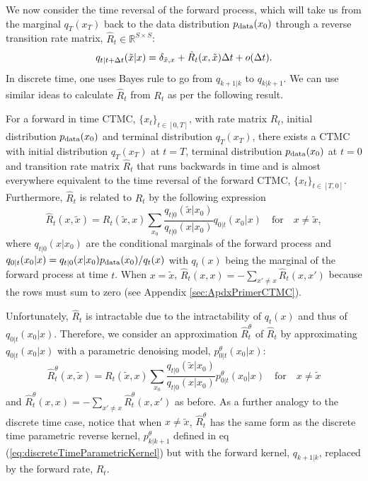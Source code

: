 \documentclass{article}
\begin{document}
We now consider the time reversal of the forward process, which will take us from the marginal $q_T(x_T)$ back to the data distribution $p_{\textup{data}}(x_0)$ through a reverse transition rate matrix, $\hat{R}_t \in \mathbb{R}^{S \times S}$:
\begin{equation}
    \textstyle q_{t | t+\Delta t}(\tilde{x} | x) = \delta_{\tilde{x}, x} + \hat{R}_t(x, \tilde{x}) \Delta t + o(\Delta t).
    \label{eq:reverseKernelDefn}
\end{equation}
In discrete time, one uses Bayes rule to go from $q_{k+1|k}$ to $q_{k|k+1}$. 
We can use similar ideas to calculate $\hat{R}_t$ from $R_t$ as per the following result.
\begin{proposition}
For a forward in time CTMC, $\{ x_t \}_{t \in [0, T]}$, with rate matrix $R_t$, initial distribution $p_{\textup{data}}(x_0)$ and terminal distribution $q_T(x_T)$, there exists a CTMC with initial distribution $q_T(x_T)$ at $t=T$, terminal distribution $p_{\textup{data}}(x_0)$ at $t=0$ and transition rate matrix $\hat{R}_t$ that runs backwards in time and is almost everywhere equivalent to the time reversal of the forward CTMC, $\{ x_t \}_{t \in [T, 0]}$. Furthermore, $\hat{R}_t$ is related to $R_t$ by the following expression
\begin{equation}
    \textstyle \hat{R}_t(x, \tilde{x}) = R_t(\tilde{x}, x)\sum_{x_0}  \frac{q_{t|0}(\tilde{x}| x_0)}{q_{t|0}(x | x_0)} q_{0|t}(x_0 | x) \quad \text{for}\quad x \neq \tilde{x},
\end{equation}
where $q_{t|0}(x|x_0)$ are the conditional marginals of the forward process and $q_{0|t}(x_0 | x) = q_{t|0}(x | x_0) p_{\textup{data}}(x_0)/q_t(x)$ with $q_t(x)$ being the marginal of the forward process at time $t$. When $x = \tilde{x}$, $\hat{R}_t(x, x) = - \sum_{x' \neq x} \hat{R}_t(x, x')$ because the rows must sum to zero (see Appendix \ref{sec:ApdxPrimerCTMC}).
\label{prop:time_reversal}
\end{proposition}
Unfortunately, $\hat{R}_t$ is intractable due to the intractability of $q_t(x)$ and thus of $q_{0|t}(x_0|x)$. Therefore, we consider an approximation $\hat{R}_t^\theta$ of $\hat{R}_t$ by approximating $q_{0|t}(x_0 | x)$ with a parametric denoising model, $p^\theta_{0|t}(x_0 | x)$:
\begin{equation}
    \textstyle \hat{R}_t^\theta(x, \tilde{x}) = R_t(\tilde{x}, x) \sum_{x_0} \frac{q_{t|0}(\tilde{x} | x_0)}{q_{t|0}(x | x_0)} p^\theta_{0|t}(x_0 | x) \quad \text{for} \quad x \neq \tilde{x}
    \label{eq:RthetaRate}
\end{equation}
and $\hat{R}^\theta_t(x, x) = - \sum_{x' \neq x} \hat{R}^\theta_t(x, x')$ as before. As a further analogy to the discrete time case, notice that when $x \neq \tilde{x}$, $\hat{R}_t^\theta$ has the same form as the discrete time parametric reverse kernel, $p^\theta_{k|k+1}$ defined in eq (\ref{eq:discreteTimeParametricKernel}) but with the forward kernel, $q_{k+1|k}$, replaced by the forward rate, $R_t$.
\end{document}
